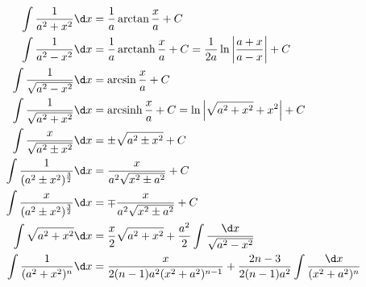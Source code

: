 \begin{example}[带 $a^2 \pm x^2$]
	\[ \begin{aligned}
			\int \frac{1}{a^2+x^2} \d x                     & = \frac{1}{a} \arctan \frac{x}{a} + C                                                        \\
			\int \frac{1}{a^2 - x^2} \d x                   & = \frac{1}{a} \arctanh \frac{x}{a} + C  = \frac{1}{2a} \ln \left| \frac{a+x}{a-x}\right| + C \\
			\int \frac{1}{\sqrt{a^2 - x^2}} \d x            & = \arcsin \frac{x}{a} + C                                                                    \\
			\int \frac{1}{\sqrt{a^2 + x^2}} \d x            & = \arcsinh \frac{x}{a} + C  = \ln \left| \sqrt{a^2 + x^2} + x^2 \right|  + C                 \\
			\int \frac{x}{\sqrt{a^2 \pm x^2}} \d x          & = \pm\sqrt{a^2 \pm x^2} + C                                                                  \\
			\int \frac{1}{(a^2 \pm x^2)^{\frac{3}{2}}} \d x & = \frac{x}{a^2\sqrt{x^2 \pm a^2}} + C                                                        \\
			\int \frac{x}{(a^2 \pm x^2)^{\frac{3}{2}}} \d x & = \mp \frac{x}{a^2\sqrt{x^2 \pm a^2}} + C                                                    \\
			\int \sqrt{a^2 + x^2} \d x                      & = \frac{x}{2}  \sqrt{a^2+x^2}+\frac{a^2}{2} \int \frac{\d x}{\sqrt{a^2-x^2}}                 \\
			\int \frac{1}{(a^2+x^2)^n} \d x                 & = \frac{x}{2(n-1)a^2(x^2+a^2)^{n-1}} + \frac{2n-3}{2(n-1)a^2} \int \frac{\d x}{(x^2+a^2)^n}
		\end{aligned} \]
\end{example}

